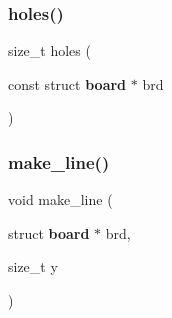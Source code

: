 \mbox{\label{tools_8h_a0febcc8c076fd7843176561167fabac1}} 
\subsubsection{holes()}
{\footnotesize\ttfamily size\+\_\+t holes (\begin{DoxyParamCaption}\item[{const struct \textbf{ board} $\ast$}]{brd }\end{DoxyParamCaption})\hspace{0.3cm}{\ttfamily [inline]}}

\mbox{\label{tools_8h_a97d0b3536ca1b715182ae405fd4fe643}} 
\subsubsection{make\+\_\+line()}
{\footnotesize\ttfamily void make\+\_\+line (\begin{DoxyParamCaption}\item[{struct \textbf{ board} $\ast$}]{brd,  }\item[{size\+\_\+t}]{y }\end{DoxyParamCaption})\hspace{0.3cm}{\ttfamily [inline]}}


